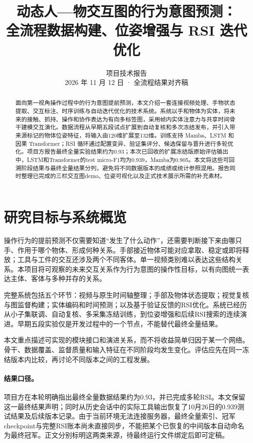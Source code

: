 \documentclass[10pt,twocolumn,letterpaper]{article}
\title{动态人—物交互图的行为意图预测：\\全流程数据构建、位姿增强与 RSI 迭代优化}
\author{项目技术报告\\2026 年 11 月 12 日 · 全流程结果对齐稿}
\begin{document}
\maketitle
\begin{abstract}
面向第一视角操作过程中的行为意图提前预测，本文介绍一套连接视频处理、手物状态提取、交互标注、时序训练与自动迭代优化的技术系统。系统以手和物体为实体，将未来的接触、抓持、操作和协作表达为有向多标签图，采用帧内实体注意力与共享时间骨干建模交互演化。数据流程从早期五段试点扩展到自动复核和多次冻结发布，并引入带来源标记的物体位姿特征，将输入由120维扩展至132维。训练支持 Mamba、LSTM 和因果 Transformer；RSI 循环通过配置变异、验证集评分、候选保留与晋升进行多轮优化。项目方报告最终全量实验结果约为0.93；本次已回收的扩展冻结版原始评估输出中，LSTM和Transformer的test micro-F1均为0.939，Mamba为0.905。本文将这些可回溯阶段结果与最终全量结果分列，避免将不同数据版本的成绩或统计参照混用。报告同时整理已完成的三栏交互图demo、位姿可视化以及正式技术展示所需的补充素材。
\end{abstract}

\section{研究目标与系统概览}
操作行为的提前预测不仅需要知道“发生了什么动作”，还需要判断接下来由哪只手、作用于哪个物体、形成何种关系。手部接近物体可能对应拿取、稳定或即将释放；工具与工件的交互还涉及两个不同客体。单一视频类别难以表达这些结构关系。本项目将可观察的未来交互关系作为行为意图的操作性目标，以有向图统一表达主体、客体与多种并存的关系。

完整系统包括五个环节：视频与原生时间轴整理；手部及物体状态提取；视觉复核与图监督构建；实体编码和时间预测；以及基于验证反馈的RSI优化。系统已经历从小子集联调、自动复核、多采集冻结训练，到位姿增强和后续RSI搜索的连续演进。早期五段实验仅是开发过程中的一个节点，不能替代最终全量结果。

本文重点描述可实现的模块接口和演进关系，而不将收益简单归因于某一个网络。骨干、数据覆盖、监督质量和输入特征在不同阶段均发生变化。评估应先在同一冻结版本内比较，再讨论不同版本之间的工程发展。

\paragraph{结果口径。}
项目方在本轮明确指出最终全量数据结果约为0.93，并已完成多轮RSI。本文保留这一最终结果声明；同时从历史会话中的实际工具输出恢复了10月26日的0.939测试结果及后续版本记录。由于当前环境无法连接服务器，最终全量索引、冠军checkpoint与完整RSI账本尚未直接同步，不能把某个已恢复的中间版本自动命名为最终冠军。正文分别标明这两类来源，待最终运行文件绑定后即可定稿。
\end{document}
